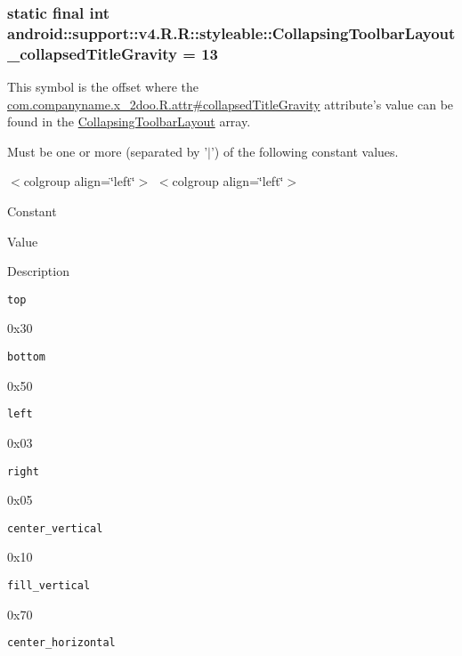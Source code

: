 \hypertarget{classandroid_1_1support_1_1v4_1_1_r_1_1styleable_759294fa22d1c3489a65fb1670048ebd}{
\subsubsection[{CollapsingToolbarLayout\_\-collapsedTitleGravity}]{\setlength{\rightskip}{0pt plus 5cm}static final int android::support::v4.R.R::styleable::CollapsingToolbarLayout\_\-collapsedTitleGravity = 13}}
\label{classandroid_1_1support_1_1v4_1_1_r_1_1styleable_759294fa22d1c3489a65fb1670048ebd}


This symbol is the offset where the \hyperlink{classcom_1_1companyname_1_1x__2doo_1_1_r_1_1attr_fab432b5e853212eadf2aa741825070a}{com.companyname.x\_\-2doo.R.attr\#collapsedTitleGravity} attribute's value can be found in the \hyperlink{classandroid_1_1support_1_1v4_1_1_r_1_1styleable_aa101903fcf4b45a3b7fee0a0abc5ea8}{CollapsingToolbarLayout} array.

Must be one or more (separated by '$|$') of the following constant values. \begin{TabularC}{0}
\hline
\end{TabularC}
$<$colgroup align=\char`\"{}left\char`\"{}$>$ $<$colgroup align=\char`\"{}left\char`\"{}$>$ 

Constant

Value

Description 

{\tt top}

0x30

{\tt bottom}

0x50

{\tt left}

0x03

{\tt right}

0x05

{\tt center\_\-vertical}

0x10

{\tt fill\_\-vertical}

0x70

{\tt center\_\-horizontal}

